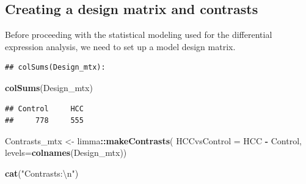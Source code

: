 \documentclass[
]{book}
\newenvironment{Shaded}{\begin{snugshade}}{\end{snugshade}}
\newcommand{\CharTok}[1]{\textcolor[rgb]{0.31,0.60,0.02}{#1}}
\newcommand{\CommentTok}[1]{\textcolor[rgb]{0.56,0.35,0.01}{\textit{#1}}}
\newcommand{\DataTypeTok}[1]{\textcolor[rgb]{0.13,0.29,0.53}{#1}}
\newcommand{\DecValTok}[1]{\textcolor[rgb]{0.00,0.00,0.81}{#1}}
\newcommand{\KeywordTok}[1]{\textcolor[rgb]{0.13,0.29,0.53}{\textbf{#1}}}
\newcommand{\NormalTok}[1]{#1}
\newcommand{\OperatorTok}[1]{\textcolor[rgb]{0.81,0.36,0.00}{\textbf{#1}}}
\newcommand{\StringTok}[1]{\textcolor[rgb]{0.31,0.60,0.02}{#1}}
\begin{document}
\hypertarget{creating-a-design-matrix-and-contrasts}{%
\subsection*{Creating a design matrix and contrasts}\label{creating-a-design-matrix-and-contrasts}}

Before proceeding with the statistical modeling used for the
differential expression analysis, we need to set up a
model design matrix.

\begin{Shaded}
\end{Shaded}

\begin{verbatim}
## colSums(Design_mtx):
\end{verbatim}

\begin{Shaded}
\begin{Highlighting}[]
\KeywordTok{colSums}\NormalTok{(Design\_mtx)}
\end{Highlighting}
\end{Shaded}

\begin{verbatim}
## Control     HCC 
##     778     555
\end{verbatim}

\begin{Shaded}
\begin{Highlighting}[]
\NormalTok{Contrasts\_mtx <{-}}\StringTok{ }\NormalTok{limma}\OperatorTok{::}\KeywordTok{makeContrasts}\NormalTok{(}
  \DataTypeTok{HCCvsControl =}\NormalTok{ HCC  }\OperatorTok{{-}}\StringTok{ }\NormalTok{Control,}
  \DataTypeTok{levels=}\KeywordTok{colnames}\NormalTok{(Design\_mtx))}

\KeywordTok{cat}\NormalTok{(}\StringTok{"Contrasts:}\CharTok{\textbackslash{}n}\StringTok{"}\NormalTok{)}
\end{Highlighting}
\end{Shaded}
\end{document}

